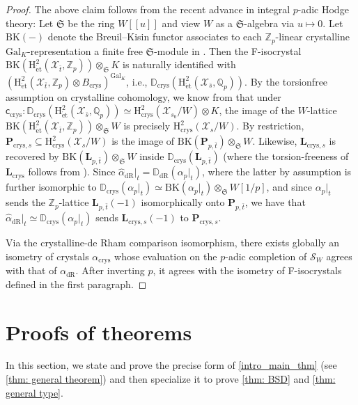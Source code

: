 \documentclass[11pt, letterpaper]{amsart}
\theoremstyle{plain}
\theoremstyle{definition}
\newcommand{\ID}{\mathbb{D}}
\newcommand{\IQ}{\mathbb{Q}}
\newcommand{\IZ}{\mathbb{Z}}
\newcommand\tensor{{\otimes}}
\newcommand{\<}{\langle}
\renewcommand{\>}{\rangle}
\newcommand{\Gal}{\mathrm{Gal}}
\newcommand{\et}{\mathrm{{\acute{e}}t}}
\newcommand{\sX}{\mathcal{X}}
\newcommand{\bL}{\mathbf{L}}
\renewcommand{\H}{\mathrm{H}}
\newcommand{\crys}{\mathrm{crys}}
\newcommand{\sS}{\mathcal{S}}
\newcommand{\bP}{\mathbf{P}}
\newcommand{\dR}{\mathrm{dR}}
\renewcommand{\sc}{\mathsf{c}}
\newcommand{\fS}{\mathfrak{S}}
\begin{document}
\begin{proof}
    
    The above claim follows from the recent advance in integral $p$-adic Hodge theory: Let $\mathfrak{S}$ be the ring $W[\![u]\!]$ and view $W$ as a $\fS$-algebra via $u \mapsto 0$. 
    Let $\mathrm{BK}(-)$ denote the Breuil--Kisin functor associates to each $\IZ_p$-linear crystalline $\Gal_K$-representation a finite free $\mathfrak{S}$-module in \cite[Thm~4.4]{BMS}. 
    Then the F-isocrystal $\mathrm{BK}(\H^2_\et(\sX_{\bar{t}}, \IZ_p)) \tensor_{\fS} K$ is naturally identified with $(\H^2_\et(\sX_{\bar{t}}, \IZ_p) \tensor B_\crys)^{\Gal_K}$, i.e., $\ID_\crys(\H^2_\et(\sX_{\bar{s}}, \IQ_p))$. 
    By the torsionfree assumption on crystalline cohomology, we know from \cite[Thm.\ 14.6.(iii)]{BMS} that under $\sc_\crys : \ID_\crys(\H^2_\et(\sX_{\bar{s}}, \IQ_p)) \simeq \H^2_\crys(\sX_{s_0}/W) \tensor K$, the image of the $W$-lattice $\mathrm{BK}(\H^2_\et(\sX_{\bar{t}}, \IZ_p)) \tensor_{\fS} W$ is precisely $\H^2_\crys(\sX_{s}/W)$. 
    By restriction, $\bP_{\crys, s} \subseteq \H^2_\crys(\sX_s/W)$ is the image of $\mathrm{BK}(\bP_{p, \bar{t}}) \tensor_{\fS} W$. 
    Likewise, $\bL_{\crys, s}$ is recovered by $\mathrm{BK}(\bL_{p, \bar{t}}) \tensor_\fS W$ inside $\ID_\crys(\bL_{p, \bar{t}})$ (where the torsion-freeness of $\bL_\crys$ follows from \cite[Prop.~4.7(iv)]{CSpin}).
    Since $\hat{\alpha}_\dR|_{t} = \ID_\dR(\alpha_p|_t)$, where the latter by assumption is further isomorphic to $\ID_\crys(\alpha_p|_t) \simeq \mathrm{BK}(\alpha_p|_t) \otimes_{\fS} W [1/p]$, and since $\alpha_p|_t$ sends the $\IZ_p$-lattice $\bL_{p, \bar{t}}(-1)$ isomorphically onto $\bP_{p, \bar{t}}$, we have that $\hat{\alpha}_{\dR}|_t \simeq \ID_\crys(\alpha_p|_t)$ sends $\bL_{\crys, s}(-1)$ to $\bP_{\crys, s}$. 

    Via the crystalline-de Rham comparison isomorphism, there exists globally an isometry of crystals $\alpha_{\crys}$ whose evaluation on the $p$-adic completion of $\sS_{W}$ agrees with that of $\alpha_\dR$. After inverting $p$, it agrees with the isometry of F-isocrystals defined in the first paragraph. 
\end{proof}



\section{Proofs of theorems}
\label{sec: proofs of theorems}
In this section, we state and prove the precise form of \cref{intro_main_thm} (see \cref{thm: general theorem}) and then specialize it to prove \cref{thm: BSD} and \cref{thm: general type}. 
\end{document}
